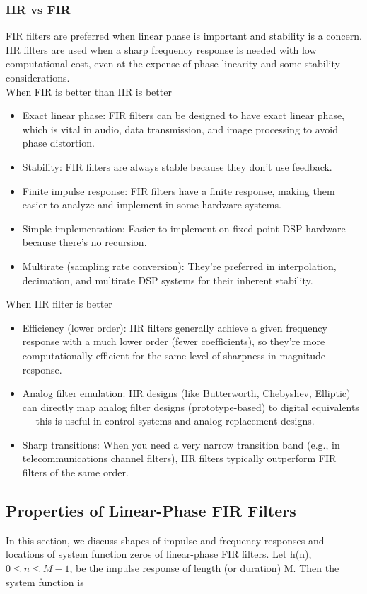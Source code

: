 \documentclass{article}
\begin{document}
\subsubsection{IIR vs FIR}
FIR filters are preferred when linear phase is important and stability is a concern. IIR filters are used when a sharp frequency response is needed with low computational cost, even at the expense of phase linearity and some stability considerations. \\
\vspace{1em}
When FIR is better than IIR is better 
\begin{itemize}
    \item Exact linear phase: FIR filters can be designed to have exact linear phase, which is vital in audio, data transmission, and image processing to avoid phase distortion.
    \item Stability: FIR filters are always stable because they don't use feedback.
    \item Finite impulse response: FIR filters have a finite response, making them easier to analyze and implement in some hardware systems.
    \item Simple implementation: Easier to implement on fixed-point DSP hardware because there's no recursion.
    \item Multirate (sampling rate conversion): They're preferred in interpolation, decimation, and  multirate DSP systems for their inherent stability.
\end{itemize}
When IIR filter is better
\begin{itemize}
    \item Efficiency (lower order): IIR filters generally achieve a given frequency response with a much lower order (fewer coefficients), so they're more computationally efficient for the same level of sharpness in magnitude response.
    \item Analog filter emulation: IIR designs (like Butterworth, Chebyshev, Elliptic) can directly map analog filter designs (prototype-based) to digital equivalents — this is useful in control systems and analog-replacement designs.
    \item Sharp transitions: When you need a very narrow transition band (e.g., in telecommunications channel filters), IIR filters typically outperform FIR filters of the same order.
\end{itemize}

\newpage
\subsection{Properties of Linear-Phase FIR Filters}
In this section, we discuss shapes of impulse and frequency responses and
locations of system function zeros of linear-phase FIR filters. Let h(n),
$0 \leq n \leq M - 1$, be the impulse response of length (or duration) M. Then
the system function is
\end{document}
